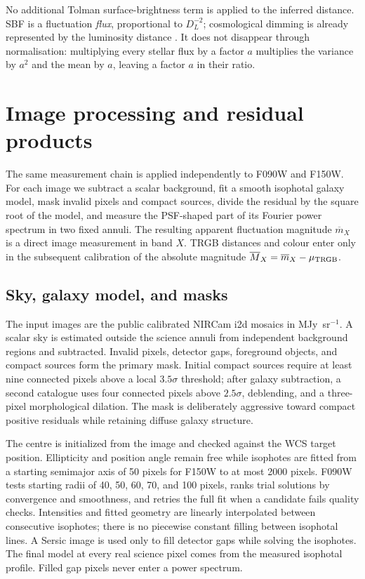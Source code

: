 \documentclass[nodoi,nocopyright]{pas}
\newcommand{\mbar}{\overline{m}}
\newcommand{\Mbar}{\overline{M}}
\begin{document}
No additional Tolman surface-brightness term is applied to the inferred
distance. SBF is a fluctuation \emph{flux}, proportional to $D_L^{-2}$;
cosmological dimming is already represented by the luminosity distance
\citep{Hogg1999}. It does not disappear through normalisation: multiplying
every stellar flux by a factor $a$ multiplies the variance by $a^2$ and the
mean by $a$, leaving a factor $a$ in their ratio.

\section{Image processing and residual products}
\label{sec:notes-images}

The same measurement chain is applied independently to F090W and F150W.
For each image we subtract a scalar background, fit a smooth isophotal galaxy
model, mask invalid pixels and compact sources, divide the residual by the
square root of the model, and measure the PSF-shaped part of its Fourier power
spectrum in two fixed annuli.  The resulting apparent fluctuation magnitude
$\mbar_X$ is a direct image measurement in band $X$.  TRGB distances and
colour enter only in the subsequent calibration of the absolute magnitude
$\Mbar_X=\mbar_X-\mu_{\rm TRGB}$.

\subsection{Sky, galaxy model, and masks}

The input images are the public calibrated NIRCam i2d mosaics in
MJy~sr$^{-1}$. A scalar sky is estimated outside the science annuli from
independent background regions and subtracted. Invalid pixels, detector gaps,
foreground objects, and compact sources form the primary mask. Initial compact
sources require at least nine connected pixels above a local $3.5\sigma$
threshold; after galaxy subtraction, a second catalogue uses four connected
pixels above $2.5\sigma$, deblending, and a three-pixel morphological dilation.
The mask is deliberately aggressive toward compact positive residuals while
retaining diffuse galaxy structure.

The centre is initialized from the image and checked against the WCS target
position. Ellipticity and position angle remain free while isophotes are fitted
from a starting semimajor axis of 50 pixels for F150W to at most 2000 pixels.
F090W tests starting radii of 40, 50, 60, 70, and 100 pixels, ranks trial
solutions by convergence and smoothness, and retries the full fit when a
candidate fails quality checks. Intensities
and fitted geometry are linearly interpolated between consecutive isophotes;
there is no piecewise constant filling between isophotal lines. A Sersic image
is used only to fill detector gaps while solving the isophotes. The final model
at every real science pixel comes from the measured isophotal profile. Filled
gap pixels never enter a power spectrum.
\end{document}
